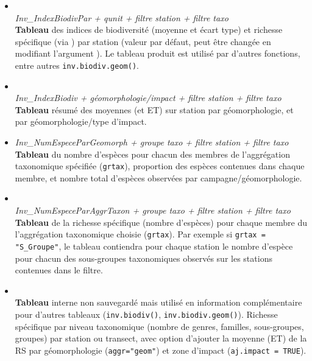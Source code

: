 \documentclass{article}
\begin{document}
\begin{itemize}

  \item[]  \\
    \emph{Inv\_IndexBiodivPar + qunit + filtre station + filtre taxo} \\
  \textbf{Tableau} des indices de biodiversité (moyenne et écart type)
  et richesse spécifique (via ) par station (valeur par défaut, peut être
  changée en modifiant l'argument ). Le tableau produit
  est utilisé par d'autres fonctions, entre autres \texttt{inv.biodiv.geom()}.

  \item[] \\
    \emph{Inv\_IndexBiodiv + géomorphologie/impact + filtre station + filtre taxo}\\
    \textbf{Tableau} résumé des moyennes (et ET) sur station par
    géomorphologie, et par géomorphologie/type d'impact.

  \item[] 
    \emph{Inv\_NumEspeceParGeomorph + groupe taxo + filtre station +
      filtre taxo} \\
    \textbf{Tableau} du nombre d'espèces pour chacun des membres de
    l'aggrégation taxonomique spécifiée (\texttt{grtax}), proportion
    des espèces contenues dans chaque membre, et nombre total
    d'espèces observées par campagne/géomorphologie.

  \item[] \\
    \emph{Inv\_NumEspeceParAggrTaxon + groupe taxo + filtre station + filtre taxo} \\
    \textbf{Tableau} de la richesse spécifique (nombre d'espèces) pour
 chaque membre du l'aggrégation taxonomique choisie
    (\texttt{grtax}). Par exemple si \texttt{grtax = "S\_Groupe"}, le
    tableau contiendra pour chaque station le nombre d'espèce pour
    chacun des sous-groupes taxonomiques observés sur les stations
    contenues dans le filtre.

  \item[] \\
    \textbf{Tableau} interne non sauvegardé mais utilisé en
    information complémentaire pour d'autres tableaux
    (\texttt{inv.biodiv()}, \texttt{inv.biodiv.geom()}). Richesse
    spécifique par niveau taxonomique (nombre de genres, familles, sous-groupes,
    groupes) par station ou transect, avec option d'ajouter la moyenne
    (ET) de la RS par géomorphologie (\texttt{aggr="geom"}) et zone
    d'impact (\texttt{aj.impact = TRUE}).


\end{itemize}
\end{document}
